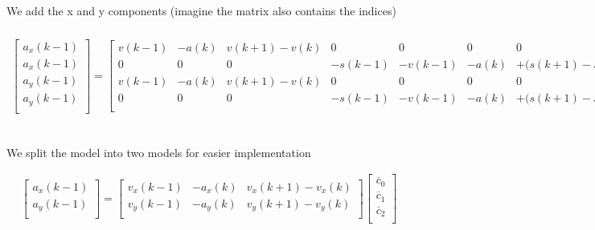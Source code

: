 \documentclass[10pt]{article}         %
\begin{document}
We add the x and y components (imagine the matrix also contains the indices)
\begin{align}
    \begin{bmatrix}
        a_x(k-1) \\ 
        a_x(k-1) \\ 
        a_y(k-1) \\ 
        a_y(k-1) \\ 
    \end{bmatrix}
    =
    \begin{bmatrix}
        v(k-1)   & - a(k) &  v(k+1) - v(k) & 0 & 0 & 0 & 0          \\
        0 & 0 & 0 & - s(k-1) & - v(k-1) & -  a(k)  &+ \bigl( s(k+1) - s(k) - dt \  v(k) \bigr)   \\
        v(k-1)   & - a(k) &  v(k+1) - v(k) & 0 & 0 & 0 & 0          \\
        0 & 0 & 0 & - s(k-1) & - v(k-1) & -  a(k)  &+ \bigl( s(k+1) - s(k) - dt \  v(k) \bigr)   \\
    \end{bmatrix}
    \begin{bmatrix}
        \overline c_0 \\
        \overline c_1 \\
        \overline c_2 \\
        \overline c_3 \\
        \overline c_4 \\
        \overline c_5 \\
        \overline c_6 \\
   \end{bmatrix}
\end{align}


We split the model into two models for easier implementation

\begin{align}
    \begin{bmatrix}
        a_x(k-1) \\ 
        a_y(k-1) \\ 
    \end{bmatrix}
    =
    \begin{bmatrix}
        v_x(k-1)   & - a_x(k) &  v_x(k+1) - v_x(k) \\
        v_y(k-1)   & - a_y(k) &  v_y(k+1) - v_y(k) \\
    \end{bmatrix}
    \begin{bmatrix}
        \overline c_0 \\
        \overline c_1 \\
        \overline c_2 \\
   \end{bmatrix}
\end{align}
\end{document}
